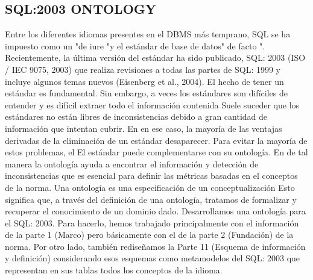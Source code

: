 \documentclass[preprint,12pt]{elsarticle}
\begin{document}







\subsection{SQL:2003 ONTOLOGY}
	
Entre los diferentes idiomas presentes en el
DBMS más temprano, SQL se ha impuesto como un "de
iure "y el estándar de base de datos" de facto ".
Recientemente, la última versión del estándar ha sido
publicado, SQL: 2003 (ISO / IEC 9075, 2003) que
realiza revisiones a todas las partes de SQL: 1999 y
incluye algunos temas nuevos (Eisenberg et al., 2004).
El hecho de tener un estándar es fundamental.
Sin embargo, a veces los estándares son difíciles de
entender y es difícil extraer todo el
información contenida Suele suceder que
los estándares no están libres de inconsistencias debido a
gran cantidad de información que intentan cubrir. En
en ese caso, la mayoría de las ventajas derivadas de la
eliminación de un estándar desaparecer.
Para evitar la mayoría de estos problemas, el
El estándar puede complementarse con su ontología. En
de tal manera la ontología ayuda a encontrar el
información y detección de inconsistencias que es
esencial para definir las métricas basadas en el
conceptos de la norma.
Una ontología es una especificación de un
conceptualización Esto significa que, a través del
definición de una ontología, tratamos de formalizar y
recuperar el conocimiento de un dominio dado.
Desarrollamos una ontología para el SQL: 2003.
Para hacerlo, hemos trabajado principalmente con el
información de la parte 1 (Marco) pero básicamente
con el de la parte 2 (Fundación) de la norma.
Por otro lado, también rediseñamos la Parte 11
(Esquema de información y definición) considerando
esos esquemas como metamodelos del SQL: 2003
que representan en sus tablas todos los conceptos de la
idioma.
\end{document}
